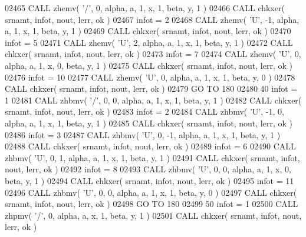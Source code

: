 \begin{DoxyCode}
02465       \textcolor{keyword}{CALL }zhemv( \textcolor{stringliteral}{'/'}, 0, alpha, a, 1, x, 1, beta, y, 1 )
02466       \textcolor{keyword}{CALL }chkxer( srnamt, infot, nout, lerr, ok )
02467       infot = 2
02468       \textcolor{keyword}{CALL }zhemv( \textcolor{stringliteral}{'U'}, -1, alpha, a, 1, x, 1, beta, y, 1 )
02469       \textcolor{keyword}{CALL }chkxer( srnamt, infot, nout, lerr, ok )
02470       infot = 5
02471       \textcolor{keyword}{CALL }zhemv( \textcolor{stringliteral}{'U'}, 2, alpha, a, 1, x, 1, beta, y, 1 )
02472       \textcolor{keyword}{CALL }chkxer( srnamt, infot, nout, lerr, ok )
02473       infot = 7
02474       \textcolor{keyword}{CALL }zhemv( \textcolor{stringliteral}{'U'}, 0, alpha, a, 1, x, 0, beta, y, 1 )
02475       \textcolor{keyword}{CALL }chkxer( srnamt, infot, nout, lerr, ok )
02476       infot = 10
02477       \textcolor{keyword}{CALL }zhemv( \textcolor{stringliteral}{'U'}, 0, alpha, a, 1, x, 1, beta, y, 0 )
02478       \textcolor{keyword}{CALL }chkxer( srnamt, infot, nout, lerr, ok )
02479       \textcolor{keywordflow}{GO TO} 180
02480    40 infot = 1
02481       \textcolor{keyword}{CALL }zhbmv( \textcolor{stringliteral}{'/'}, 0, 0, alpha, a, 1, x, 1, beta, y, 1 )
02482       \textcolor{keyword}{CALL }chkxer( srnamt, infot, nout, lerr, ok )
02483       infot = 2
02484       \textcolor{keyword}{CALL }zhbmv( \textcolor{stringliteral}{'U'}, -1, 0, alpha, a, 1, x, 1, beta, y, 1 )
02485       \textcolor{keyword}{CALL }chkxer( srnamt, infot, nout, lerr, ok )
02486       infot = 3
02487       \textcolor{keyword}{CALL }zhbmv( \textcolor{stringliteral}{'U'}, 0, -1, alpha, a, 1, x, 1, beta, y, 1 )
02488       \textcolor{keyword}{CALL }chkxer( srnamt, infot, nout, lerr, ok )
02489       infot = 6
02490       \textcolor{keyword}{CALL }zhbmv( \textcolor{stringliteral}{'U'}, 0, 1, alpha, a, 1, x, 1, beta, y, 1 )
02491       \textcolor{keyword}{CALL }chkxer( srnamt, infot, nout, lerr, ok )
02492       infot = 8
02493       \textcolor{keyword}{CALL }zhbmv( \textcolor{stringliteral}{'U'}, 0, 0, alpha, a, 1, x, 0, beta, y, 1 )
02494       \textcolor{keyword}{CALL }chkxer( srnamt, infot, nout, lerr, ok )
02495       infot = 11
02496       \textcolor{keyword}{CALL }zhbmv( \textcolor{stringliteral}{'U'}, 0, 0, alpha, a, 1, x, 1, beta, y, 0 )
02497       \textcolor{keyword}{CALL }chkxer( srnamt, infot, nout, lerr, ok )
02498       \textcolor{keywordflow}{GO TO} 180
02499    50 infot = 1
02500       \textcolor{keyword}{CALL }zhpmv( \textcolor{stringliteral}{'/'}, 0, alpha, a, x, 1, beta, y, 1 )
02501       \textcolor{keyword}{CALL }chkxer( srnamt, infot, nout, lerr, ok )

\end{DoxyCode}
